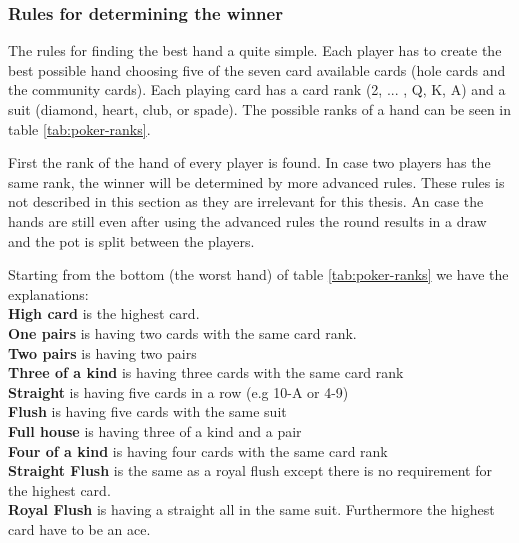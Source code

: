 \subsubsection*{Rules for determining the winner}
The rules for finding the best hand a quite simple. Each player has to create the best possible hand choosing five of the seven card available cards (hole cards and the community cards). Each playing card has a card rank (2, ... , Q, K, A) and a suit (diamond, heart, club, or spade). The possible ranks of a hand can be seen in table \ref{tab:poker-ranks}. 

First the rank of the hand of every player is found. In case two players has the same rank, the winner will be determined by more advanced rules. These rules is not described in this section as they are irrelevant for this thesis. An case the hands are still even after using the advanced rules the round results in a draw and the pot is split between the players.

Starting from the bottom (the worst hand) of table \ref{tab:poker-ranks} we have the explanations:\\
\textbf{High card} is the highest card.  \\
\textbf{One pairs} is having two cards with the same card rank. \\
\textbf{Two pairs} is having two pairs\\
\textbf{Three of a kind} is having three cards with the same card rank \\
\textbf{Straight} is having five cards in a row (e.g 10-A or 4-9)\\
\textbf{Flush} is having five cards with the same suit\\
\textbf{Full house} is having three of a kind and a pair\\
\textbf{Four of a kind} is having four cards with the same card rank \\
\textbf{Straight Flush} is the same as a royal flush except there is no requirement for the highest card.\\
\textbf{Royal Flush} is having a straight all in the same suit. Furthermore the highest card have to be an ace.\\

